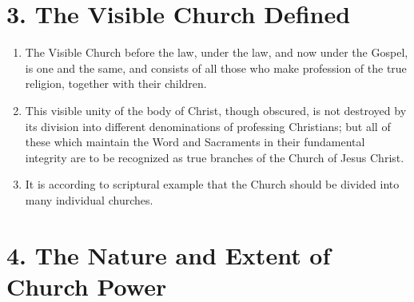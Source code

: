 \documentclass[
]{book}
\providecommand{\tightlist}{%
  \setlength{\itemsep}{0pt}\setlength{\parskip}{0pt}}
\begin{document}
\hypertarget{the-visible-church-defined}{%
\section*{3. The Visible Church Defined}\label{the-visible-church-defined}}

\protect\hypertarget{chapter-slug-3-the-visible-church-defined}{\href{}{}}

\begin{enumerate}
\def\labelenumi{\arabic{enumi}.}
\tightlist
\item
  \protect\hypertarget{3}{\href{}{}}The Visible Church before the law, under the law, and now under the Gospel, is one and the same, and consists of all those who make profession of the true religion, together with their children.
\item
  \protect\hypertarget{3.2}{\href{}{}}This visible unity of the body of Christ, though obscured, is not destroyed by its division into different denominations of professing Christians; but all of these which maintain the Word and Sacraments in their fundamental integrity are to be recognized as true branches of the Church of Jesus Christ.
\item
  It is according to scriptural example that the Church should be divided into many individual churches.
\end{enumerate}

\hypertarget{the-nature-and-extent-of-church-power}{%
\section*{4. The Nature and Extent of Church Power}\label{the-nature-and-extent-of-church-power}}

\protect\hypertarget{chapter-slug-4-the-nature-and-extent-of-church-power}{\href{}{}}
\end{document}
